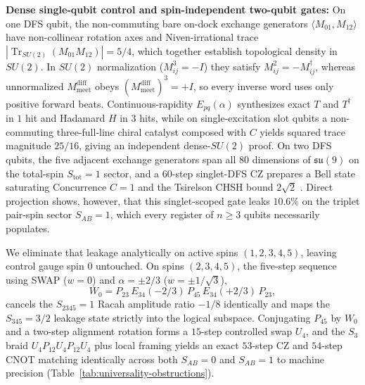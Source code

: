\textbf{Dense single-qubit control and spin-independent two-qubit gates:} On one DFS qubit, the non-commuting bare
on-dock exchange generators $\langle M_{01}, M_{12}\rangle$ have non-collinear rotation axes and Niven-irrational trace
$|\operatorname{Tr}_{SU(2)}(M_{01} M_{12})| = 5/4$, which together establish topological density in $SU(2)$. In $SU(2)$
normalization ($M_{ij}^3 = -I$) they satisfy $M_{ij}^2 = -M_{ij}^\dagger$, whereas unnormalized
$M_{\mathrm{meet}}^{\mathrm{diff}}$ obeys $(M_{\mathrm{meet}}^{\mathrm{diff}})^3 = +I$, so every inverse word uses only
positive forward beats. Continuous-rapidity $E_{pq}(\alpha)$ synthesizes exact $T$ and $T^\dagger$ in $1$ hit and
Hadamard $H$ in $3$ hits, while on single-excitation slot qubits a non-commuting three-full-line chiral catalyst
composed with $C$ yields squared trace magnitude $25/16$, giving an independent dense-$SU(2)$ proof. On two DFS qubits,
the five adjacent exchange generators span all $80$ dimensions of $\mathfrak{su}(9)$ on the total-spin $S_{\mathrm{tot}} = 1$
sector, and a $60$-step singlet-DFS CZ prepares a Bell state saturating Concurrence $C = 1$ and the Tsirelson CHSH bound
$2\sqrt{2}$ \cite{clauser1969}. Direct projection shows, however, that this singlet-scoped gate leaks $10.6\%$ on the
triplet pair-spin sector $S_{AB} = 1$, which every register of $n \ge 3$ qubits necessarily populates.

We eliminate that leakage analytically on active spins $(1, 2, 3, 4, 5)$, leaving control gauge spin $0$ untouched. On
spins $(2, 3, 4, 5)$, the five-step sequence using SWAP ($w = 0$) and $\alpha = \pm 2/3$ ($w = \pm 1/\sqrt{3}$),
\begin{equation}
W_0 = P_{23}\, E_{34}(-2/3)\, P_{45}\, E_{34}(+2/3)\, P_{23},
\label{eq:leakage-clear}
\end{equation}
cancels the $S_{2345} = 1$ Racah amplitude ratio $-1/8$ identically and maps the $S_{345} = 3/2$ leakage state strictly
into the logical subspace. Conjugating $P_{45}$ by $W_0$ and a two-step alignment rotation forms a $15$-step controlled
swap $U_4$, and the $S_3$ braid $U_4 P_{12} U_4 P_{12} U_4$ plus local framing yields an exact $53$-step CZ and $54$-step
CNOT matching identically across both $S_{AB} = 0$ and $S_{AB} = 1$ to machine precision
(Table~\ref{tab:universality-obstructions}).

